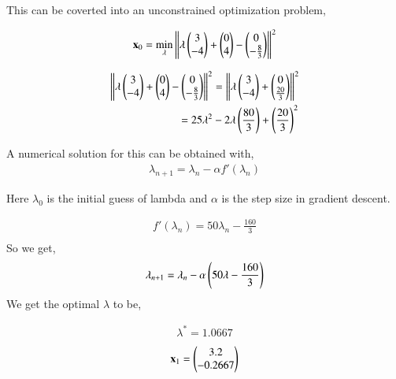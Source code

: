 \documentclass[journal,12pt,twocolumn]{IEEEtran}
\renewcommand\thesection{\arabic{section}}
\begin{document}
\begin{enumerate}
This can be coverted into an unconstrained optimization problem,
	
		\begin{align}
			\mathbf{x}_0 = \min_{\mathbf{\lambda}} \left\lVert\lambda \begin{pmatrix}3\\-4\end{pmatrix}+\begin{pmatrix}0\\4\end{pmatrix}-\begin{pmatrix}0\\-\frac{8}{3}\end{pmatrix}\right\rVert^2\\
		\end{align}

		\begin{align}
			\left\lVert\lambda \begin{pmatrix}3\\-4\end{pmatrix}+\begin{pmatrix}0\\4\end{pmatrix}-\begin{pmatrix}0\\-\frac{8}{3}\end{pmatrix}\right\rVert^2&= \left\lVert\lambda \begin{pmatrix}3\\-4\end{pmatrix}+\begin{pmatrix}0\\\frac{20}{3}\end{pmatrix}\right\rVert^2\\
			= 25\lambda^2 &-2\lambda \left(\frac{80}{3}\right)+\left(\frac{20}{3}\right)^2
		\end{align}

A numerical solution for this can be obtained with,
		\begin{align}
			\lambda_{n+1} = \lambda_n - \alpha f'(\lambda_n)
		\end{align}

Here $\lambda_0$ is the initial guess of lambda and $\alpha$ is the step size in gradient descent.

		\begin{align}
			f'(\lambda_n) = 50\lambda_n-\frac{160}{3}\\
		\end{align}
So we get,
		\begin{align}
			\lambda_{n+1} = \lambda_n - \alpha \left(50\lambda-\frac{160}{3}\right) 
		\end{align}
We get the optimal $\lambda$ to be,

		\begin{align}
			\lambda^* = 1.0667
		\end{align}
\begin{align}
	\mathbf{x}_1 = \begin{pmatrix}3.2\\-0.2667\end{pmatrix}
\end{align}
		\begin{table}[h]
			\centering
			
			\caption{}
			\label{tab:2}
		\end{table}

\end{enumerate}

%
\end{document}
